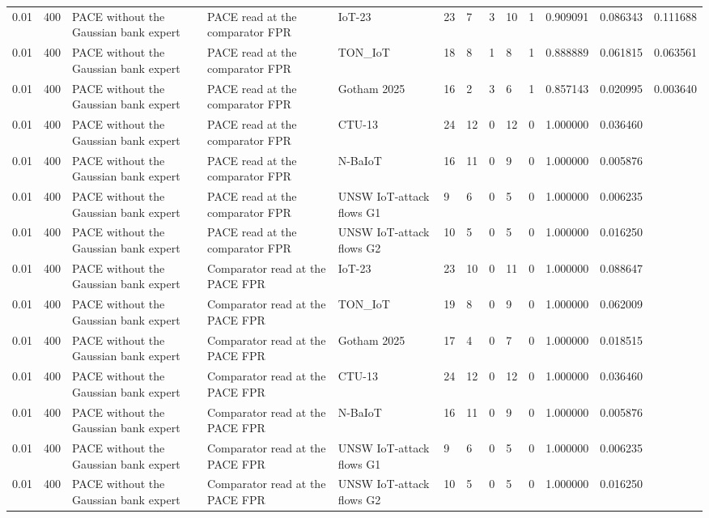 \begin{tabular}{lllllllllllll}
0.01 & 400 & PACE without the Gaussian bank expert & PACE read at the comparator FPR & IoT-23 & 23 & 7 & 3 & 10 & 1 & 0.909091 & 0.086343 & 0.111688 \\
0.01 & 400 & PACE without the Gaussian bank expert & PACE read at the comparator FPR & TON\_IoT & 18 & 8 & 1 & 8 & 1 & 0.888889 & 0.061815 & 0.063561 \\
0.01 & 400 & PACE without the Gaussian bank expert & PACE read at the comparator FPR & Gotham 2025 & 16 & 2 & 3 & 6 & 1 & 0.857143 & 0.020995 & 0.003640 \\
0.01 & 400 & PACE without the Gaussian bank expert & PACE read at the comparator FPR & CTU-13 & 24 & 12 & 0 & 12 & 0 & 1.000000 & 0.036460 &  \\
0.01 & 400 & PACE without the Gaussian bank expert & PACE read at the comparator FPR & N-BaIoT & 16 & 11 & 0 & 9 & 0 & 1.000000 & 0.005876 &  \\
0.01 & 400 & PACE without the Gaussian bank expert & PACE read at the comparator FPR & UNSW IoT-attack flows G1 & 9 & 6 & 0 & 5 & 0 & 1.000000 & 0.006235 &  \\
0.01 & 400 & PACE without the Gaussian bank expert & PACE read at the comparator FPR & UNSW IoT-attack flows G2 & 10 & 5 & 0 & 5 & 0 & 1.000000 & 0.016250 &  \\
0.01 & 400 & PACE without the Gaussian bank expert & Comparator read at the PACE FPR & IoT-23 & 23 & 10 & 0 & 11 & 0 & 1.000000 & 0.088647 &  \\
0.01 & 400 & PACE without the Gaussian bank expert & Comparator read at the PACE FPR & TON\_IoT & 19 & 8 & 0 & 9 & 0 & 1.000000 & 0.062009 &  \\
0.01 & 400 & PACE without the Gaussian bank expert & Comparator read at the PACE FPR & Gotham 2025 & 17 & 4 & 0 & 7 & 0 & 1.000000 & 0.018515 &  \\
0.01 & 400 & PACE without the Gaussian bank expert & Comparator read at the PACE FPR & CTU-13 & 24 & 12 & 0 & 12 & 0 & 1.000000 & 0.036460 &  \\
0.01 & 400 & PACE without the Gaussian bank expert & Comparator read at the PACE FPR & N-BaIoT & 16 & 11 & 0 & 9 & 0 & 1.000000 & 0.005876 &  \\
0.01 & 400 & PACE without the Gaussian bank expert & Comparator read at the PACE FPR & UNSW IoT-attack flows G1 & 9 & 6 & 0 & 5 & 0 & 1.000000 & 0.006235 &  \\
0.01 & 400 & PACE without the Gaussian bank expert & Comparator read at the PACE FPR & UNSW IoT-attack flows G2 & 10 & 5 & 0 & 5 & 0 & 1.000000 & 0.016250 &  \\

\end{tabular}
